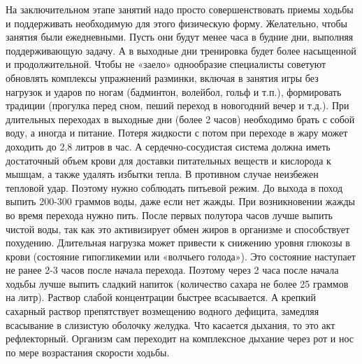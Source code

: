\documentclass[14pt, a4paper]{article}
\begin{document}
    На заключительном этапе занятий надо просто совершенствовать  приемы ходьбы и поддерживать необходимую для этого физическую форму. Желательно, чтобы занятия были ежедневными. Пусть они будут менее часа в будние дни, выполняя поддерживающую задачу. А в выходные  дни тренировка будет более насыщенной и продолжительной. Чтобы не «заело» однообразие специалисты советуют обновлять комплексы упражнений  разминки, включая в занятия игры без нагрузок и ударов по ногам (бадминтон, волейбол, гольф и т.п.), формировать традиции (прогулка перед сном, пеший переход в новогодний вечер и т.д.). При длительных переходах в выходные дни (более 2 часов) необходимо брать с собой воду, а иногда и питание. Потеря жидкости с потом при переходе в жару может доходить до 2,8 литров в час. А сердечно-сосудистая система должна иметь достаточный объем крови для доставки питательных веществ и кислорода к мышцам, а также удалять избытки тепла. В противном случае неизбежен тепловой удар. Поэтому  нужно соблюдать питьевой режим. До выхода в поход выпить 200-300 граммов воды, даже если нет жажды. При возникновении жажды во время перехода нужно пить. После первых полутора часов лучше выпить чистой воды, так как это активизирует обмен жиров в организме и способствует похудению.   Длительная нагрузка может привести к снижению уровня глюкозы в крови (состояние гипогликемии или «волчьего голода»). Это состояние наступает не ранее 2-3 часов после начала перехода. Поэтому через 2 часа после начала  ходьбы лучше выпить сладкий напиток (количество сахара не более 25 граммов на литр). Раствор слабой концентрации быстрее всасывается. А крепкий сахарный раствор препятствует возмещению водного дефицита, замедляя всасывание в слизистую оболочку желудка. Что касается дыхания, то это акт рефлекторный. Организм сам переходит на комплексное дыхание через рот и нос по мере возрастания скорости ходьбы.
\end{document}
